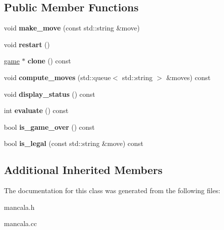 \subsection*{Public Member Functions}
\begin{DoxyCompactItemize}
\item 
void {\bfseries make\+\_\+move} (const std\+::string \&move)\hypertarget{classmain__savitch__14_1_1Mancala_a9cab7122179df32a128e1032d2071990}{}\label{classmain__savitch__14_1_1Mancala_a9cab7122179df32a128e1032d2071990}

\item 
void {\bfseries restart} ()\hypertarget{classmain__savitch__14_1_1Mancala_aeba0a1b17a315e1916197ca52a5a099b}{}\label{classmain__savitch__14_1_1Mancala_aeba0a1b17a315e1916197ca52a5a099b}

\item 
\hyperlink{classmain__savitch__14_1_1game}{game} $\ast$ {\bfseries clone} () const \hypertarget{classmain__savitch__14_1_1Mancala_a8158419b34c69ffc1fde1f58a82e8c31}{}\label{classmain__savitch__14_1_1Mancala_a8158419b34c69ffc1fde1f58a82e8c31}

\item 
void {\bfseries compute\+\_\+moves} (std\+::queue$<$ std\+::string $>$ \&moves) const \hypertarget{classmain__savitch__14_1_1Mancala_a5655c5e4494f3680007953ae58ecdc43}{}\label{classmain__savitch__14_1_1Mancala_a5655c5e4494f3680007953ae58ecdc43}

\item 
void {\bfseries display\+\_\+status} () const \hypertarget{classmain__savitch__14_1_1Mancala_a8e86ccccbe4cca4bcdcf5d08177785a0}{}\label{classmain__savitch__14_1_1Mancala_a8e86ccccbe4cca4bcdcf5d08177785a0}

\item 
int {\bfseries evaluate} () const \hypertarget{classmain__savitch__14_1_1Mancala_a1d7383671667bf085b98d3800b1c082f}{}\label{classmain__savitch__14_1_1Mancala_a1d7383671667bf085b98d3800b1c082f}

\item 
bool {\bfseries is\+\_\+game\+\_\+over} () const \hypertarget{classmain__savitch__14_1_1Mancala_aa12ed5d41262e363738e249ae8ad6132}{}\label{classmain__savitch__14_1_1Mancala_aa12ed5d41262e363738e249ae8ad6132}

\item 
bool {\bfseries is\+\_\+legal} (const std\+::string \&move) const \hypertarget{classmain__savitch__14_1_1Mancala_a8406fc376124313196bd531bd288b9eb}{}\label{classmain__savitch__14_1_1Mancala_a8406fc376124313196bd531bd288b9eb}

\end{DoxyCompactItemize}
\subsection*{Additional Inherited Members}


The documentation for this class was generated from the following files\+:\begin{DoxyCompactItemize}
\item 
mancala.\+h\item 
mancala.\+cc\end{DoxyCompactItemize}
